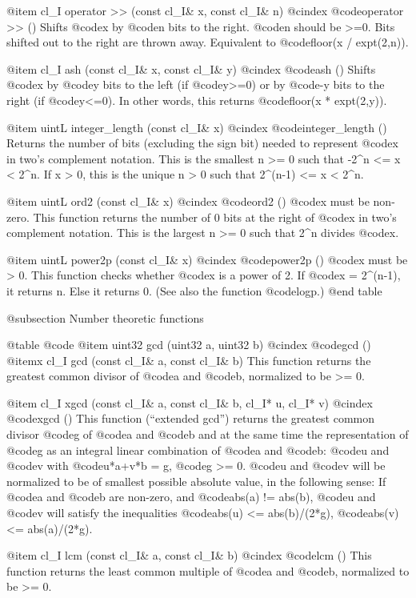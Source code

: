 @item cl_I operator >> (const cl_I& x, const cl_I& n)
@cindex @code{operator >> ()}
Shifts @code{x} by @code{n} bits to the right. @code{n} should be >=0.
Bits shifted out to the right are thrown away.
Equivalent to @code{floor(x / expt(2,n))}.

@item cl_I ash (const cl_I& x, const cl_I& y)
@cindex @code{ash ()}
Shifts @code{x} by @code{y} bits to the left (if @code{y}>=0) or
by @code{-y} bits to the right (if @code{y}<=0). In other words, this
returns @code{floor(x * expt(2,y))}.

@item uintL integer_length (const cl_I& x)
@cindex @code{integer_length ()}
Returns the number of bits (excluding the sign bit) needed to represent @code{x}
in two's complement notation. This is the smallest n >= 0 such that
-2^n <= x < 2^n. If x > 0, this is the unique n > 0 such that
2^(n-1) <= x < 2^n.

@item uintL ord2 (const cl_I& x)
@cindex @code{ord2 ()}
@code{x} must be non-zero. This function returns the number of 0 bits at the
right of @code{x} in two's complement notation. This is the largest n >= 0
such that 2^n divides @code{x}.

@item uintL power2p (const cl_I& x)
@cindex @code{power2p ()}
@code{x} must be > 0. This function checks whether @code{x} is a power of 2.
If @code{x} = 2^(n-1), it returns n. Else it returns 0.
(See also the function @code{logp}.)
@end table


@subsection Number theoretic functions

@table @code
@item uint32 gcd (uint32 a, uint32 b)
@cindex @code{gcd ()}
@itemx cl_I gcd (const cl_I& a, const cl_I& b)
This function returns the greatest common divisor of @code{a} and @code{b},
normalized to be >= 0.

@item cl_I xgcd (const cl_I& a, const cl_I& b, cl_I* u, cl_I* v)
@cindex @code{xgcd ()}
This function (``extended gcd'') returns the greatest common divisor @code{g} of
@code{a} and @code{b} and at the same time the representation of @code{g}
as an integral linear combination of @code{a} and @code{b}:
@code{u} and @code{v} with @code{u*a+v*b = g}, @code{g} >= 0.
@code{u} and @code{v} will be normalized to be of smallest possible absolute
value, in the following sense: If @code{a} and @code{b} are non-zero, and
@code{abs(a) != abs(b)}, @code{u} and @code{v} will satisfy the inequalities
@code{abs(u) <= abs(b)/(2*g)}, @code{abs(v) <= abs(a)/(2*g)}.

@item cl_I lcm (const cl_I& a, const cl_I& b)
@cindex @code{lcm ()}
This function returns the least common multiple of @code{a} and @code{b},
normalized to be >= 0.

